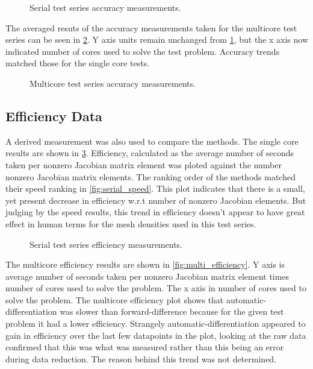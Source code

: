 \documentclass[preprint,12pt]{elsarticle}
\begin{document}
\begin{figure}[h]
  \centering
  \scalebox{.7}{}
  \caption{Serial test series accuracy measurements.}
  \label{fig:serial_accuracy}
\end{figure}

The averaged resuts of the accuracy measurements taken for the multicore test series can be seen in
\ref{fig:multi_accuracy}. Y axis units remain unchanged from \ref{fig:serial_accuracy}, but the x
axis now indicated number of cores used to solve the test problem. Accuracy trends matched those for
the single core tests. 

\begin{figure}[h]
  \centering
  \scalebox{.7}{}
  \caption{Multicore test series accuracy measurements.}
  \label{fig:multi_accuracy}
\end{figure}

\subsection{Efficiency Data}
A derived measurement was also used to compare the methods. The single core results are shown in
\ref{fig:serial_efficiency}. Efficiency, calculated as the average number of seconds taken per nonzero Jacobian matrix element 
was ploted against the number nonzero Jacobian matrix elements. The ranking order of the methods
matched their speed ranking in \ref{fig:serial_speed}. This plot indicates that there is a small,
yet present decrease in efficiency w.r.t number of nonzero Jacobian elements. But judging by the
speed results, this trend in efficiency doesn't appear to have great effect in human terms for the
mesh densities used in this test series.  

\begin{figure}[h]
  \centering
  \scalebox{.7}{}
  \caption{Serial test series efficiency measurements.}
  \label{fig:serial_efficiency}
\end{figure}

The multicore efficiency results are shown in \ref{fig:multi_efficiency}. Y axis is average number
of seconds taken per nonzero Jacobian matrix element times number of cores used to solve the
problem. The x axis in number of cores used to solve the problem. The multicore efficiency plot
shows that automatic-differentiation was slower than forward-difference because for the given test
problem it had a lower efficiency. Strangely automatic-differentiation appeared to gain in
efficiency over the last few datapoints in the plot, looking at the raw data confirmed that this was
what was measured rather than this being an error during data reduction. The reason behind this
trend was not determined.
\end{document}

